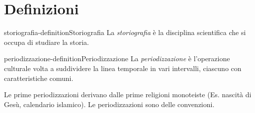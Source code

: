 \documentclass[preview]{standalone}
\begin{document}
\genpage

\section{Definizioni}

\begin{snippetdefinition}{storiografia-definition}{Storiografia}
    La \textit{storiografia} è la disciplina scientifica che si occupa di studiare la storia.
\end{snippetdefinition}

\begin{snippetdefinition}{periodizzazione-definition}{Periodizzazione}
    La \textit{periodizzazione} è l'operazione culturale volta a suddividere la linea temporale in vari intervalli,
    ciascuno con caratteristiche comuni.
\end{snippetdefinition}

\begin{plainhtml}
    Le prime periodizzazioni derivano dalle prime religioni monoteiste (Es. nascità di Gesù, calendario islamico).
    Le periodizzazioni sono delle convenzioni.
\end{plainhtml}
\end{document}
